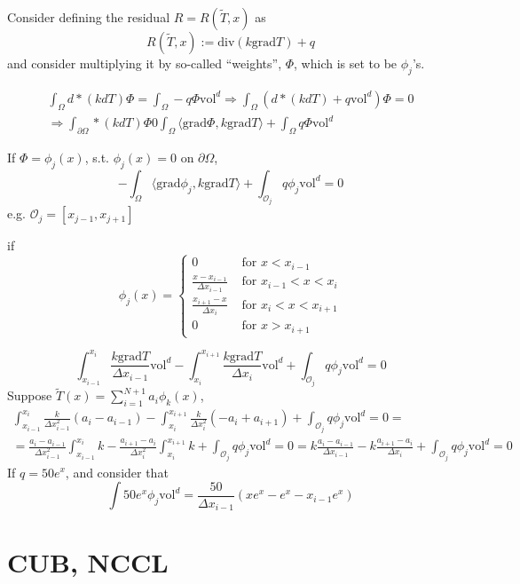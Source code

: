 \documentclass[10pt]{amsart}
\begin{document}
\begin{multicols*}{2}
  Consider defining the residual $R= R(\widetilde{T},x)$ as
  \[
R(\widetilde{T},x):= \text{div}(k\text{grad}T) + q
\]
and consider multiplying it by so-called ``weights'', $\Phi$, which is set to be $\phi_j$'s.

\[
\begin{gathered}
  \int_{\Omega} d*(kdT) \Phi = \int_{\Omega}-q\Phi \text{vol}^d \Longrightarrow \int_{\Omega}(d*(kdT) + q\text{vol}^d) \Phi = 0 \\ 
  \Longrightarrow \int_{\partial \Omega} *(kdT) \Phi 0 \int_{\Omega} \langle \text{grad}\Phi, k \text{grad}T \rangle + \int_{\Omega} q\Phi \text{vol}^d
  \end{gathered}
\]

If $\Phi= \phi_j(x)$, s.t. $\phi_j(x) =0$ on $\partial \Omega$,
\[
-\int_{\Omega} \langle \text{grad}\phi_j, k \text{grad} T\rangle + \int_{\mathcal{O}_j } q\phi_j\text{vol}^d = 0 
\]
e.g. $\mathcal{O}_j = [ x_{j-1}, x_{j+1}]$

if
\[
\phi_j(x) = \begin{cases} 0 & \text{ for } x < x_{i-1} \\
  \frac{ x- x_{i-1} }{ \Delta x_{i-1} } & \text{ for } x_{i-1} < x < x_i \\
  \frac{ x_{i+1} - x}{ \Delta x_i } & \text{ for } x_i < x < x_{i+1} \\
  0 & \text{ for } x > x_{i+1} \end{cases}
\]

\[
\int_{x_{i-1}}^{x_i} \frac{k \text{grad} T}{\Delta x_{i-1}} \text{vol}^d - \int_{x_i}^{x_{i+1}} \frac{k\text{grad}T }{ \Delta x_i} \text{vol}^d + \int_{\mathcal{O}_j } q \phi_j\text{vol}^d = 0 
\]
Suppose $\widetilde{T}(x) = \sum_{i=1}^{N+1} a_i \phi_k(x)$,
\[
\begin{gathered}
  \int_{x_{i-1}}^{x_i} \frac{k}{ \Delta x_{i-1}^2 } (a_i - a_{i-1} ) - \int_{x_i}^{x_{i+1} }\frac{k}{ \Delta x_i^2} (-a_i + a_{i+1} ) + \int_{\mathcal{O}_j} q \phi_j \text{vol}^d = 0 = \\
  = \frac{a_i - a_{i-1}}{ \Delta x_{i-1}^2 } \int_{x_{i-1}}^{x_i} k  - \frac{a_{i+1} - a_i }{ \Delta x_i^2} \int_{x_i}^{x_{i+1} }k + \int_{\mathcal{O}_j} q\phi_j\text{vol}^d = 0 = k \frac{ a_i - a_{i-1}}{\Delta x_{i-1} } - k \frac{ a_{i+1} - a_i }{ \Delta x_i}  + \int_{\mathcal{O}_j} q\phi_j\text{vol}^d = 0
\end{gathered}
\]
If $q= 50 e^x$, and consider that
\[
\int  50 e^x \phi_j \text{vol}^d = \frac{50}{ \Delta x_{i-1} } (xe^x- e^x - x_{i-1} e^x)
\]

\part{CUB, NCCL}


\end{multicols*}
\end{document}
